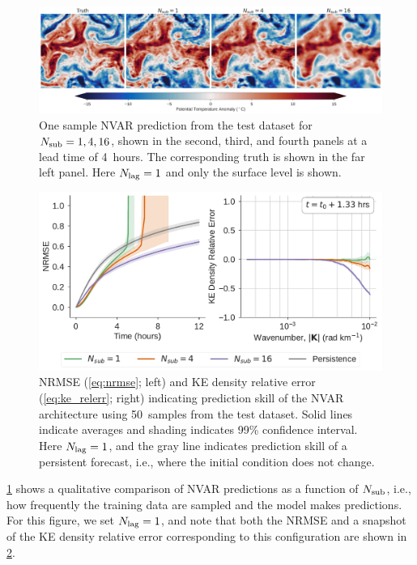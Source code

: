 \begin{figure}
    \centering
    \includegraphics[width=\textwidth]{../figures/nvar_4hr_snap.jpg}
    \caption{One sample NVAR prediction from the test dataset for $N_\text{sub} =
        1,4,16$, shown in the second, third, and fourth panels at a lead time of 4~hours.
        The corresponding truth is shown in the far left panel.
        Here $N_\text{lag}=1$ and only the surface level is shown.
    }
    \label{fig:nvar_qualitative}
\end{figure}

\begin{figure}
    \centering
    \includegraphics[width=.8\textwidth]{../figures/nvar-nrmse-and-kere.pdf}
    \caption{NRMSE (\cref{eq:nrmse}; left) and KE density
        relative error (\cref{eq:ke_relerr}; right)
        indicating prediction skill of the NVAR
        architecture using 50~samples from the test dataset.
        Solid lines indicate averages and shading indicates 99\% confidence
        interval.
        Here $N_\text{lag}=1$, and the gray line indicates prediction skill of a
        persistent forecast, i.e., where the initial condition does not change.
    }
    \label{fig:nvar_nrmse}
\end{figure}

\cref{fig:nvar_qualitative} shows a qualitative comparison of NVAR predictions
as a function of $N_\text{sub}$, i.e., how frequently the training data are sampled and
the model makes predictions.
For this figure, we set $N_\text{lag}=1$, and note that both the NRMSE and a snapshot
of the KE density relative error corresponding to this configuration are shown in
\cref{fig:nvar_nrmse}.

